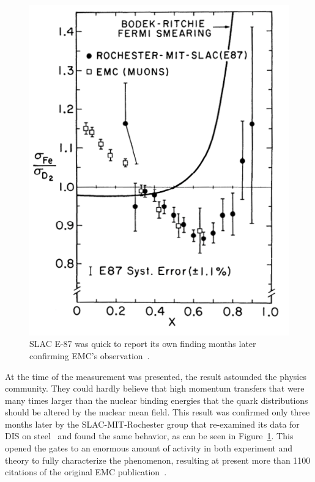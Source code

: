 \begin{figure}
 	\centering
 	\includegraphics[height=0.35\textheight]{figures/background/SLAC-E87.png}
 	\caption{SLAC E-87 was quick to report its own finding months later confirming EMC's observation~\cite{PhysRevLett.50.1431}.}
 	\vspace{-20pt}
 	\label{fig:emc-e87}
\end{figure}
At the time of the measurement was presented, the result astounded the physics community. They could hardly believe that high momentum transfers that were many times larger than the nuclear binding energies that the quark distributions should be altered by the nuclear mean field. This result was confirmed only three months later by the SLAC-MIT-Rochester group that re-examined its data for DIS on steel~\cite{PhysRevLett.50.1431} and found the same behavior, as can be seen in Figure~\ref{fig:emc-e87}. This opened the gates to an enormous amount of activity in both experiment and theory to fully characterize the phenomenon, resulting at present more than 1100 citations of the original EMC publication~\cite{Aubert:1983xm}. 

